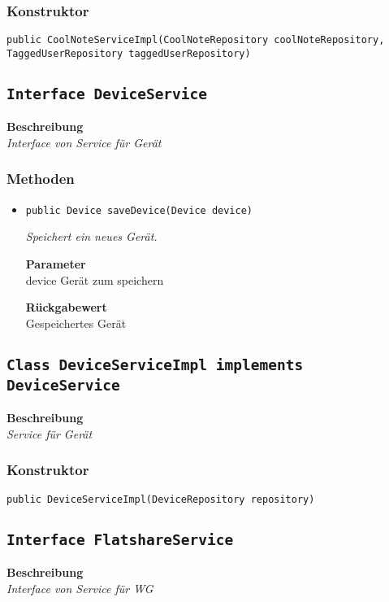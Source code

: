     \subsubsection{Konstruktor}
    \texttt{public CoolNoteServiceImpl(CoolNoteRepository coolNoteRepository, TaggedUserRepository taggedUserRepository)}
    \subsection{\texttt{Interface DeviceService}}
    \textbf{Beschreibung} \\
    \textit{Interface von Service für Gerät}
    \subsubsection{Methoden}
    \begin{itemize}
    	\item{\texttt{public Device saveDevice(Device device)}}
    	
    	\textit{Speichert ein neues Gerät.}
    	
    	\textbf{Parameter} \\
    	device Gerät zum speichern
    	
    	\textbf{Rückgabewert} \\
    	Gespeichertes Gerät
    \end{itemize}
    \subsection{\texttt{Class DeviceServiceImpl implements DeviceService}}
    \textbf{Beschreibung} \\
    \textit{Service für Gerät}
    \subsubsection{Konstruktor}
    \texttt{public DeviceServiceImpl(DeviceRepository repository)}
    \subsection{\texttt{Interface FlatshareService}}
    \textbf{Beschreibung} \\
    \textit{Interface von Service für WG}
